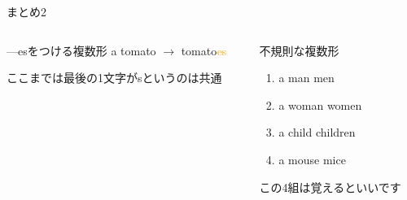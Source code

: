 \documentclass[aspectratio=169,xcolor={dvipsnames,table}]{beamer}
\begin{document}
\begin{frame}[plain]{まとめ2}
\begin{columns}
\begin{column}[t]{.385\textwidth}
\begin{block}{---esをつける複数形}
a tomato $\longrightarrow$ tomato\textcolor{orange}{es}
\hfill{}\hspace*{15pt}
\end{block}
{\scriptsize ここまでは最後の1文字がsというのは共通}
\end{column}
\pause
\begin{column}[t]{.55\textwidth}
\begin{block}{不規則な複数形}\small
 \begin{enumerate}
 \item a man \hfill\rightarrow\hfill{}men \hfill\hfill\mbox{} 
 \item a woman \hfill\rightarrow\hfill{}women \hfill\mbox{} 
 \item a child \hfill\rightarrow\hfill{}children \hfill\mbox{} 
 \item a mouse \hfill\rightarrow\hfill{}mice \hfill\hfill\mbox{} 
  \end{enumerate}
\end{block}
\hfill{\scriptsize この4組は覚えるといいです}
\end{column}
\end{columns}
\end{frame}
\end{document}
